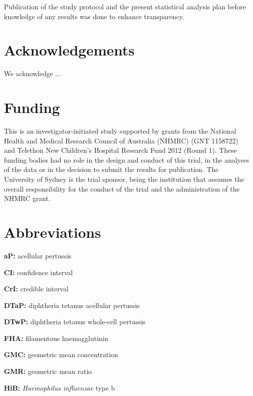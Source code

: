 \documentclass{bmcart}
\begin{document}
Publication of the study protocol and the present statistical analysis plan before knowledge of any results was done to enhance transparency.


\begin{backmatter}

\section*{Acknowledgements}

We acknowledge ...

\section*{Funding}

This is an investigator-initiated study supported by grants from the National Health and Medical Research Council of Australia (NHMRC) (GNT 1158722) and Telethon New Children's Hospital Research Fund 2012 (Round 1).
These funding bodies had no role in the design and conduct of this trial, in the analyses of the data or in the decision to submit the results for publication.
The University of Sydney is the trial sponsor, being the institution that assumes the overall responsibility for the conduct of the trial and the administration of the NHMRC grant.

\section*{Abbreviations}

\textbf{aP:} acellular pertussis

\textbf{CI:} confidence interval

\textbf{CrI:} credible interval

\textbf{DTaP:} diphtheria tetanus acellular pertussis 

\textbf{DTwP:} diphtheria tetanus whole-cell pertussis 

\textbf{FHA:} filamentous haemagglutinin

\textbf{GMC:} geometric mean concentration

\textbf{GMR:} geometric mean ratio

\textbf{HiB:} \textit{Haemophilus influenzae} type b 


\end{backmatter}
\end{document}
